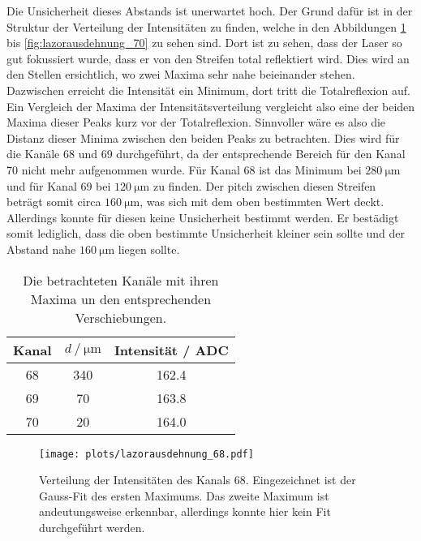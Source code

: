Die Unsicherheit dieses Abstands ist unerwartet hoch.
Der Grund dafür ist in der Struktur der Verteilung der Intensitäten zu finden, welche in den Abbildungen \ref{fig:lazorausdehnung_68} bis \ref{fig:lazorausdehnung_70} zu sehen sind.
Dort ist zu sehen, dass der Laser so gut fokussiert wurde, dass er von den Streifen total reflektiert wird.
Dies wird an den Stellen ersichtlich, wo zwei Maxima sehr nahe beieinander stehen.
Dazwischen erreicht die Intensität ein Minimum, dort tritt die Totalreflexion auf.
Ein Vergleich der Maxima der Intensitätsverteilung vergleicht also eine der beiden Maxima dieser Peaks kurz vor der Totalreflexion.
Sinnvoller wäre es also die Distanz dieser Minima zwischen den beiden Peaks zu betrachten.
Dies wird für die Kanäle 68 und 69 durchgeführt, da der entsprechende Bereich für den Kanal 70 nicht mehr aufgenommen wurde.
Für Kanal 68 ist das Minimum bei $\SI{280}{\micro\metre}$ und für Kanal 69 bei $\SI{120}{\micro\metre}$ zu finden.
Der pitch zwischen diesen Streifen beträgt somit circa $\SI{160}{\micro\metre}$, was sich mit dem oben bestimmten Wert deckt.
Allerdings konnte für diesen keine Unsicherheit bestimmt werden.
Er bestädigt somit lediglich, dass die oben bestimmte Unsicherheit kleiner sein sollte und der Abstand nahe $\SI{160}{\micro\metre}$ liegen sollte.

\begin{table}
  \centering
  \caption{Die betrachteten Kanäle mit ihren Maxima un den entsprechenden Verschiebungen.}
  \label{tab:maxima}
  \begin{tabular}{S[table-format=2.0] S[table-format=2.0] S[table-format=3.1]}
    \toprule
    {Kanal} & {$d \mathbin{/} \si{\micro\metre}$} & {Intensität / ADC} \\
     & 340 & 162.4 \\
    69 & 70  & 163.8 \\
    70 & 20  & 164.0 \\
    \bottomrule
  \end{tabular}
\end{table}

\begin{figure}
  \centering
  \texttt{[image: plots/lazorausdehnung\_68.pdf]}
  \caption{Verteilung der Intensitäten des Kanals 68. Eingezeichnet ist der Gauss-Fit des ersten Maximums. Das zweite Maximum ist andeutungsweise erkennbar, allerdings konnte hier kein Fit durchgeführt werden.}
  \label{fig:lazorausdehnung_68}
\end{figure}

